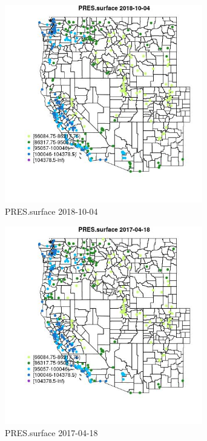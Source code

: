\begin{figure} 
\centering  
\includegraphics[width=0.77\textwidth]{Code_Outputs/Report_ML_input_PM25_Step4_part_f_de_duplicated_aveswNAs_MapObsPRESsurface2018-10-04.jpg} 
\caption{\label{fig:Report_ML_input_PM25_Step4_part_f_de_duplicated_aveswNAsMapObsPRESsurface2018-10-04}PRES.surface 2018-10-04} 
\end{figure} 
 

\begin{figure} 
\centering  
\includegraphics[width=0.77\textwidth]{Code_Outputs/Report_ML_input_PM25_Step4_part_f_de_duplicated_aveswNAs_MapObsPRESsurface2017-04-18.jpg} 
\caption{\label{fig:Report_ML_input_PM25_Step4_part_f_de_duplicated_aveswNAsMapObsPRESsurface2017-04-18}PRES.surface 2017-04-18} 
\end{figure} 
 

